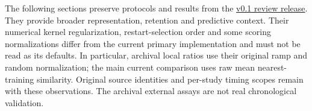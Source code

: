 \documentclass[12pt]{article}
\newcommand{\nnl}{\operatorname{NNL}}
\begin{document}
The following sections preserve protocols and results from the
\href{https://github.com/Ray16/PALM/releases/tag/lowrank-v0.1.0-review-20261021-r2}{v0.1 review release}.
They provide broader representation,
retention and predictive context. Their numerical kernel regularization,
restart-selection order and some scoring normalizations differ from the
current primary implementation and must not be read as its defaults.
In particular, archival local ratios use their original ramp and random
normalization; the main current comparison uses raw mean nearest-training
similarity. Original source identities and per-study timing scopes remain
with these observations. The archival external assays are not real chronological
validation.

{\renewcommand{\nnl}{\operatorname{NNL}_{\mathrm{archive}}}
}



\end{document}
